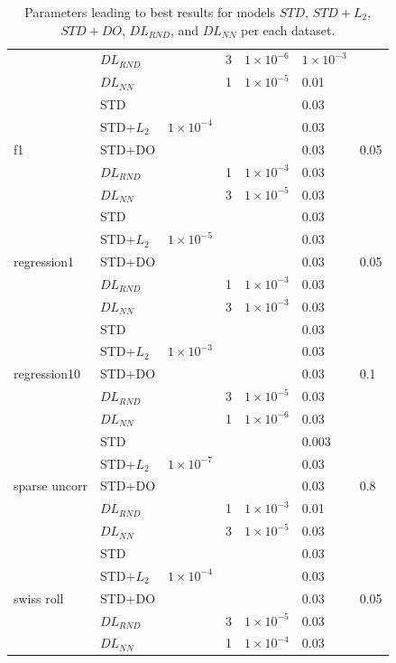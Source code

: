 \documentclass{article}
\begin{document}
\begin{table}[tb]
\begin{center}
\begin{small}
\begin{sc}
\begin{tabular}{lllllll}
 & $DL_{RND}$ & & 3  & $1 	\times 10^{-6}$ & $1 \times 10^{-3}$ & \\
 & $DL_{NN}$ & & 1  & $1 \times 10^{-5}$ & 0.01 &  \\
 \hline
\multirow{5}{*}{f1} & STD  & & & & 0.03 & \\
 & STD+$L_2$ & $1 \times 10^{-4}$ & & & 0.03 & \\
 & STD+DO & & & & 0.03 & 0.05 \\
 & $DL_{RND}$ & & 1  & $1 \times 10^{-3}$ & 0.03 & \\
 & $DL_{NN}$ & & 3  & $1 \times 10^{-5}$ & 0.03 & \\\cline{2-7}
\multirow{5}{*}{regression1}  & STD  & & & & 0.03 & \\
 & STD+$L_2$ & $1 \times 10^{-5}$ & & & 0.03 & \\
 & STD+DO & & & & 0.03 & 0.05 \\
 & $DL_{RND}$ & & 1  & $1 \times 10^{-3}$ & 0.03 & \\
 & $DL_{NN}$ & & 3  & $1 \times 10^{-3}$ & 0.03 & \\\cline{2-7}
\multirow{5}{*}{regression10} & STD  & & & & 0.03 & \\
 & STD+$L_2$ & $1 \times 10^{-3}$ & & & 0.03 & \\
 & STD+DO & & & & 0.03 & 0.1  \\
 & $DL_{RND}$ & & 3  & $1 \times 10^{-5}$ & 0.03 & \\
 & $DL_{NN}$ & & 1  & $1 	\times 10^{-6}$ & 0.03 & \\\cline{2-7}
\multirow{5}{*}{sparse uncorr} & STD  & & & & 0.003 & \\
 & STD+$L_2$ & $1	\times 10^{-7}$ & & & 0.03 & \\
 & STD+DO & & & & 0.03 & 0.8  \\
 & $DL_{RND}$ & & 1  & $1 \times 10^{-3}$ & 0.01 & \\
 & $DL_{NN}$ & & 3  & $1 \times 10^{-5}$ & 0.03 & \\\cline{2-7}
\multirow{5}{*}{swiss roll} & STD  & & & & 0.03 & \\
 & STD+$L_2$ & $1 \times 10^{-4}$ & & & 0.03 & \\
 & STD+DO & & & & 0.03 & 0.05 \\
 & $DL_{RND}$ & & 3  & $1 \times 10^{-5}$ & 0.03 & \\
 & $DL_{NN}$ & & 1  & $1 \times 10^{-4}$ & 0.03 & \\

 \bottomrule
  \end{tabular}
  \end{sc}
  \end{small}
  \end{center}

  \caption{Parameters leading to best results for models $STD$, $STD+L_2$, $STD+DO$, $DL_{RND}$, and $DL_{NN}$ per each dataset.}
  \label{tab:bestparam-table}
\end{table}
\end{document}
